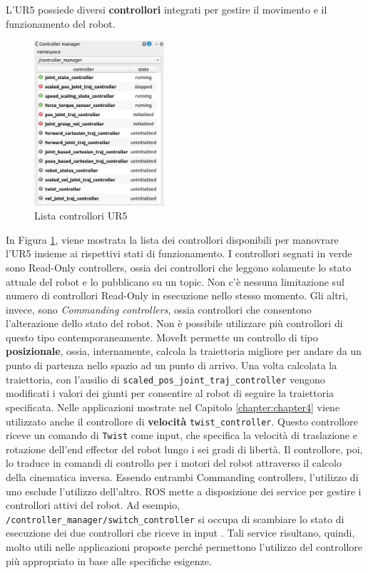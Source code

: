 L'UR5 possiede diversi \textbf{controllori} integrati per gestire il movimento e il funzionamento del robot. 
\begin{figure}[H]
    \centering
    \includegraphics*[width=0.43\textwidth]{images/controller_manager.png}
    \caption{Lista controllori UR5}
    \label{fig:controllers}
\end{figure}
In Figura \ref{fig:controllers}, viene mostrata la lista dei controllori disponibili per manovrare l'UR5 insieme ai rispettivi 
stati di funzionamento. 
I controllori segnati in verde sono Read-Only controllers, ossia dei controllori che leggono solamente lo stato attuale del 
robot e lo pubblicano su un topic. Non c'\`{e} nessuna limitazione sul numero di controllori Read-Only in esecuzione 
nello stesso momento. Gli altri, invece, sono \textit{Commanding controllers}, ossia controllori che consentono l'alterazione dello 
stato del robot. Non \`{e} possibile utilizzare pi\`{u} controllori di questo tipo contemporaneamente. 
MoveIt permette un controllo di tipo \textbf{posizionale}, ossia, internamente, calcola la traiettoria migliore 
per andare da un punto di partenza nello spazio ad un punto di arrivo. 
Una volta calcolata la traiettoria, con l'ausilio di \verb|scaled_pos_joint_traj_controller| 
vengono modificati i valori dei giunti per consentire al robot di seguire la traiettoria specificata. 
Nelle applicazioni mostrate nel Capitolo \ref{chapter:chapter4} viene utilizzato anche il controllore di 
\textbf{velocit\`{a}} \verb|twist_controller|. Questo controllore riceve un comando di \verb|Twist| come input, 
che specifica la velocit\`{a} di traslazione e rotazione dell'end effector del robot lungo i sei gradi di libert\`{a}. 
Il controllore, poi, lo traduce in comandi di controllo per i motori del robot attraverso il calcolo della cinematica inversa.
Essendo entrambi Commanding controllers, l'utilizzo di uno esclude l'utilizzo 
dell'altro. ROS mette a disposizione dei service per gestire i controllori attivi del robot. Ad esempio, 
\verb|/controller_manager/switch_controller| si occupa di scambiare lo stato di esecuzione dei due controllori che riceve 
in input \cite{controller_manager}. Tali service risultano, quindi, molto utili nelle applicazioni proposte perch\'{e} permettono 
l'utilizzo del controllore pi\`{u} appropriato in base alle specifiche esigenze.